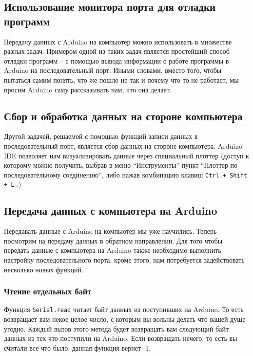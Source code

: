 \documentclass[a4paper,twoside]{book}
\newcommand{\hotkey}[1]{
  \texttt{#1}
}
\begin{document}
\subsection{Использование монитора порта для отладки программ}

Передачу данных с Arduino на компьютер можно использовать в множестве разных
задач. Примером одной из таких задач является простейший способ отладки программ
-- с помощью вывода информации о работе программы в Arduino на последовательный
порт. Иными словами, вместо того, чтобы пытаться самим понять, что же пошло не
так и почему что-то не работает, мы просим Arduino саму рассказывать нам, что
она делает.

\subsection{Сбор и обработка данных на стороне компьютера}

Другой задачей, решаемой с помощью функций записи данных в последовательный
порт, является сбор данных на стороне компьютера. Arduino IDE позволяет нам
визуализировать данные через специальный плоттер (доступ к которому можно
получить, выбрав в меню ``Инструменты'' пункт ``Плоттер по последовательному
соединению'', либо нажав комбинацию клавиш \hotkey{Ctrl + Shift + L}.)

\subsection{Передача данных с компьютера на Arduino}

Передавать данные с Arduino на компьютер мы уже научились. Теперь посмотрим на
передачу данных в обратном направлении. Для того чтобы передать данные с
компьютера на Arduino также необходимо выполнить настройку последовательного
порта; кроме этого, нам потребуется задействовать несколько новых функций.

\subsubsection{Чтение отдельных байт}

Функция \texttt{Serial.read} читает байт данных из поступивших на Arduino. То
есть возвращает вам некое целое число, с которым вы вольны делать что вашей душе
угодно. Каждый вызов этого метода будет возвращать вам следующий байт данных из
тех что поступили на Arduino. Если возвращать нечего, то есть вы считали все что
было, данная функция вернет -1.
\end{document}
